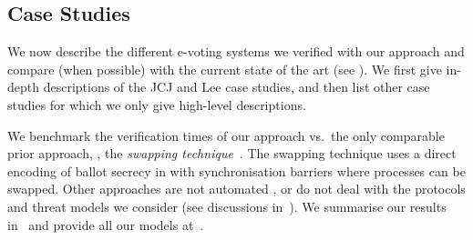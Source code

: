 

\renewcommand{\check}{\cmark}
\newcommand{\nope}{\xmark}
\newcommand{\nonterm}{\ding{61}}


\subsection{Case Studies}
\label{sec:case:proto}
We now describe the different e-voting systems we verified with our approach
and compare (when possible) with the current state of the art %
(see ).
We first give in-depth descriptions of the JCJ and Lee case studies, and
then list other case studies for which we only give
high-level descriptions.

%
We benchmark the verification times of our approach vs.~the only 
comparable prior approach, \ie, the {\em swapping
technique}~\cite{vote-CSF16}. The swapping technique uses
a direct encoding of ballot secrecy in
\proverif with synchronisation barriers where processes can be swapped.
Other approaches are not automated ,
or do not deal with the protocols and threat models we consider
(see discussions in~).
%
We summarise our results in~ and provide all our \proverif models at~\cite{pv-code}.
%

